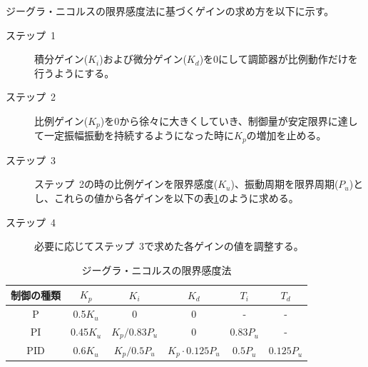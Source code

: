 \documentclass[a4j]{ujarticle}
\begin{document}
ジーグラ・ニコルスの限界感度法に基づくゲインの求め方を以下に示す。
\begin{description}
  \item[ステップ~1] 積分ゲイン($K_i$)および微分ゲイン($K_d$)を0にして調節器が比例動作だけを行うようにする。
  \item[ステップ~2] 比例ゲイン($K_p$)を0から徐々に大きくしていき、制御量が安定限界に達して一定振幅振動を持続するようになった時に$K_p$の増加を止める。
  \item[ステップ~3] ステップ~2の時の比例ゲインを限界感度($K_u$)、振動周期を限界周期($P_u$)とし、これらの値から各ゲインを以下の表\ref{table:Ziegler-Nichols}のように求める。
  \item[ステップ~4]必要に応じてステップ~3で求めた各ゲインの値を調整する。
\end{description}
\begin{table}[]
  \centering
  \caption{ジーグラ・ニコルスの限界感度法}
  \label{table:Ziegler-Nichols}
  \begin{tabular}{c|c|c|c|c|c}
    \hline
    制御の種類  & $K_p$ & $K_i$ & $K_d$ & $T_i$ & $T_d$ \\\hline \hline
    P & 0.5$K_u$ & 0 & 0 & - & - \\
    PI & 0.45$K_u$ & $K_p/0.83P_u$ & 0 & $0.83P_u$ & - \\
    PID & 0.6$K_u$ & $K_p/0.5P_u$  & $K_p \cdot 0.125P_u$ & $0.5P_u$ & $0.125P_u$ \\\hline
  \end{tabular}
\end{table}
\end{document}
